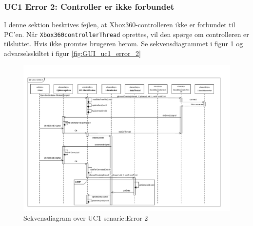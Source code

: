 \subsubsection{UC1 Error 2: Controller er ikke forbundet}
I denne sektion beskrives fejlen, at Xbox360-controlleren ikke er forbundet til PC'en. Når \texttt{Xbox360controllerThread} oprettes, vil den spørge om controlleren er tilsluttet. Hvis ikke promtes brugeren herom. Se sekvensdiagrammet i figur \ref{fig:cd_uc1_error_2} og advarselsskiltet i figur \ref{fig:GUI_uc1_error_2}

\begin{figure}[H]
\centering
\includegraphics[width=\textwidth* 1,height=\textwidth* 7/10 ]{../fig/diagrammer/pc/sd_uc1_Error_2.pdf}
\caption{Sekvensdiagram over UC1 senarie:Error 2}
\label{fig:cd_uc1_error_2}
\end{figure}

